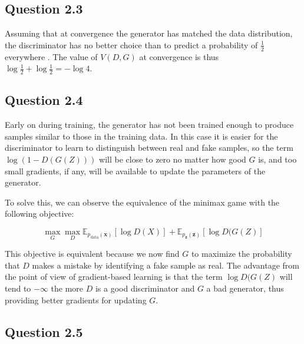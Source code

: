 \documentclass{article}
\begin{document}
\subsection*{Question 2.3}

Assuming that at convergence the generator has matched the data distribution, the discriminator has no better choice than to predict a probability of $\tfrac{1}{2}$ everywhere \cite{goodfellow2014generative}. The value of $V(D, G)$ at convergence is thus $\log\tfrac{1}{2} + \log\tfrac{1}{2} = -\log 4$.

\subsection*{Question 2.4}

Early on during training, the generator has not been trained enough to produce samples similar to those in the training data. In this case it is easier for the discriminator to learn to distinguish between real and fake samples, so the term $\log (1-D(G(Z)))$ will be close to zero no matter how good $G$ is, and too small gradients, if any, will be available to update the parameters of the generator.

To solve this, we can observe the equivalence of the minimax game with the following objective:

\begin{equation}
\max_G \max_D \mathbb{E}_{p_{\text{data}}(\mathbf{x})}[\log D(X)] + \mathbb{E}_{p_{\mathbf{z}}(\mathbf{z})}[\log D(G(Z)]
\end{equation}

This objective is equivalent because we now find $G$ to maximize the probability that $D$ makes a mistake by identifying a fake sample as real. The advantage from the point of view of gradient-based learning is that the term $\log D(G(Z)$ will tend to $-\infty$ the more $D$ is a good discriminator and $G$ a bad generator, thus providing better gradients for updating $G$.

\subsection*{Question 2.5}
\end{document}
